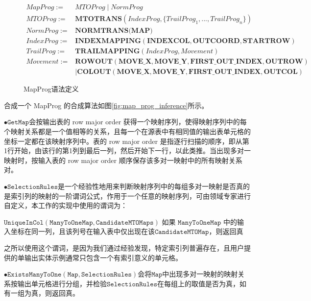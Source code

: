 \documentclass[design, pageheader]{njubachelor}
\begin{document}
\begin{figure}[!htbp]
    \begin{ttmath}
    \begin{align*} 
MapProg := & MTOProg \mid NormProg \\
MTOProg := & {\textbf {MTOTRANS}}({IndexProg, \{TrailProg_{1}, ..., TrailProg_{n}\}}) \\
NormProg := & {\textbf {NORMTRANS(MAP)}} \\
IndexProg := & \textbf {INDEXMAPPING}(\textbf{INDEXCOL}, \textbf{OUTCOORD}, \textbf{STARTROW}) \\
TrailProg := & {\textbf {TRAILMAPPING}}(IndexProg, Movement) \\
Movement := & \textbf {ROWOUT}(\textbf{MOVE\_X}, \textbf{MOVE\_Y}, \textbf{FIRST\_OUT\_INDEX}, \textbf{OUTROW}) \\ &\mid \textbf{COLOUT}(\textbf{MOVE\_X}, \textbf{MOVE\_Y}, \textbf{FIRST\_OUT\_INDEX}, \textbf{OUTCOL})
    \end{align*}
\end{ttmath}
    \caption{MapProg语法定义}
    \label{fig:map_prog} 
\end{figure}

合成一个 MapProg 的合成算法如图\ref{fig:map_prog_inference}所示。

$\bullet \mathtt{GetMap}$会按输出表的 row major order 获得一个映射序列，使得映射序列中的每个映射关系都是一个值相等的关系，且每一个在源表中有相同值的输出表单元格的坐标一定都在该映射序列中。表的 row major order 是指逐行扫描的顺序，即从第1行开始，由该行的第1列到最后一列，然后开始下一行，以此类推。当出现多对一映射时，按输入表的 row major order 顺序保存该多对一映射中的所有映射关系对。

$\bullet \mathtt{SelectionRules}$是一个经验性地用来判断映射序列中的每组多对一映射是否真的是索引列的映射的一阶谓词公式，作用于一个任意的映射序列，可由领域专家进行自定义，本工作的实现中使用的谓词为：

$\mathtt{UniqueInCol(ManyToOneMap, CandidateMTOMaps)}$ 如果 $\mathtt{ManyToOneMap}$ 中的输入坐标在同一列，且该列号在输入表中仅出现在该$\mathtt{CandidateMTOMap}$，则返回真

之所以使用这个谓词，是因为我们通过经验发现，特定索引列普遍存在，且用户提供的单输出实体示例通常只包含一个有索引意义的单元格。

$\bullet \mathtt{ExistsManyToOne(Map, SelectionRules)}$会将$\mathtt{Map}$中出现多对一映射的映射关系按输出单元格进行分组，并检验$\mathtt{SelectionRules}$在每组上的取值是否为真，如有一组为真，则返回真。
\end{document}
